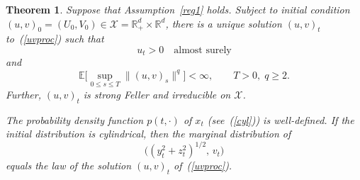\documentclass[11pt, twoside]{report}
\newtheorem{theorem}{Theorem}[section]
\renewcommand{\vec}[1]{{\mathbf{#1}}}
\begin{document}

\begin{theorem} \label{wp}
Suppose that Assumption~\ref{reg1} holds. Subject to initial
condition $(u,v)_0=(U_0,V_0)\in \mathcal X=\mathbb R_+^d\times\mathbb R^d$,
there is a unique solution $(u,v)_t$ to~(\ref{uvproc}) such that
\[
u_t>0 \quad \text{almost surely}
\]
and
\[
\mathbb E\Big[\sup_{0\le s\le T}\|(u,v)_s\|^q\Big]<\infty,
\qquad
T>0,\; q\ge 2.
\]
Further, $(u,v)_t$ is strong Feller and irreducible on $\mathcal X$.

The probability density function $p(t,\cdot)$ of $x_t$
(see~(\ref{cyl})) is well-defined. If the initial distribution is
cylindrical, then the marginal distribution of
\[
\big((y_t^2+z_t^2)^{1/2},\,v_t\big)
\]
equals the law of the solution $(u,v)_t$ of~(\ref{uvproc}).
\end{theorem}
\end{document}
